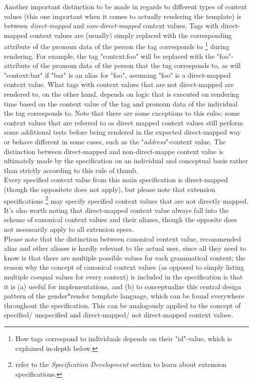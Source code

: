 \documentclass{article}
\newcommand{\GenderRender}{
    gender*render
}
\begin{document}
    Another important distinction to be made in regards to different types of context values (this one important when it comes to actually rendering the template) is between \emph{direct-mapped} and \emph{non-direct-mapped} context values.
    Tags with direct-mapped context values are (usually) simply replaced with the corresponding attribute of the pronoun data of the person the tag corresponds to \footnote{How tags correspond to individuals depends on their "id"-value, which is explained in-depth below.} during rendering.
    For example, the tag "{context:foo}" will be replaced with the "foo"-attribute of the pronoun data of the person that the tag corresponds to, as will "{context:bar}" if "bar" is an alias for "foo", assuming "foo" is a direct-mapped context value.
    What tags with context values that are not direct-mapped are rendered to, on the other hand, depends on logic that is executed on rendering time based on the context value of the tag and pronoun data of the individual the tag corresponds to.
    Note that there are some exceptions to this rules;
some context values that are referred to as direct mapped context values still perform some additional tests before being rendered in the expected direct-mapped way or behave different in some cases, such as the "\emph{address}"-context value.
    The distinction between direct-mapped and non-direct-mappe context value is ultimately made by the specification on an individual and conceptual basis rather than strictly according to this rule of thumb.\\
    Every specified context value from this main specification is direct-mapped (though the oppositete does not apply), but please note that extension specifications \footnote{refer to the \emph{Specification Development} section to learn about extension specifications.} may specify specified context values that are not directly mapped.
    It's also worth noting that direct-mapped context value always fall into the scheme of canonical context values and their aliases, though the opposite does not necessarily apply to all extension specs.\\

    Please note that the distinction between canonical context value, recommended alias and other aliases is hardly relevant to the actual user, since all they need to know is that there are multiple possible values for each grammatical context;
    the reason why the concept of canonical context values (as opposed to simply listing multiple coequal values for every context) is included in the specification is that it is (a) useful for implementations, and (b) to conceptualize this central design pattern of the \GenderRender template language, which can be found everywhere throughout the specification.
    This can be analogously applied to the concept of specified/ unspecified and direct-mapped/ not direct-mapped context values.\\
\end{document}
